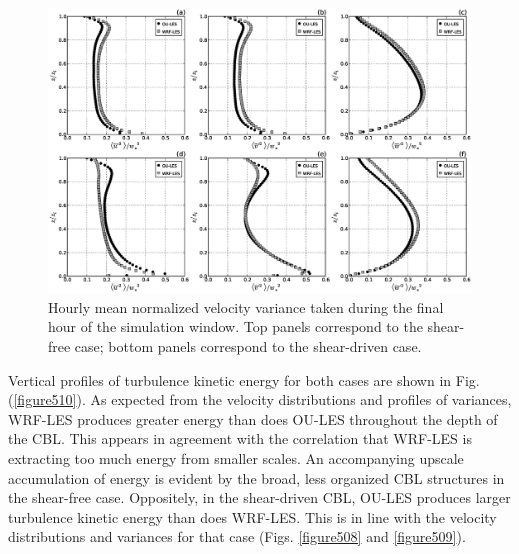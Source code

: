 \begin{figure}[!ht]
\begin{center}
\includegraphics[width=\textwidth]{figures/chapter5/velocity_variance}
\end{center}
\caption{Hourly mean normalized velocity variance taken during the final hour of the simulation window. Top panels correspond to the shear-free case; bottom panels correspond to the shear-driven case.}
\label{figure509}
\end{figure}


Vertical profiles of turbulence kinetic energy for both cases are shown in Fig. (\autoref{figure510}). As expected from the velocity distributions and profiles of variances, WRF-LES produces greater energy than does OU-LES throughout the depth of the CBL. This appears in agreement with the correlation that WRF-LES is extracting too much energy from smaller scales. An accompanying upscale accumulation of energy is evident by the broad, less organized CBL structures in the shear-free case. Oppositely, in the shear-driven CBL, OU-LES produces larger turbulence kinetic energy than does WRF-LES. This is in line with the velocity distributions and variances for that case (Figs. \autoref{figure508} and \autoref{figure509}). 


